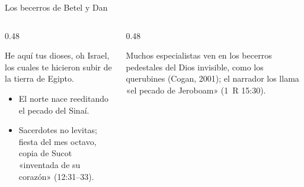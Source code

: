 \begin{frame}{Los becerros de Betel y Dan}
\begin{columns}[T,onlytextwidth]
\begin{column}{0.48\textwidth}
\par\smallskip
\begin{cita}He aquí tus dioses, oh Israel, los cuales te hicieron subir de la tierra de Egipto.\end{cita}
\footnotesize
\begin{itemize}
\item El norte nace reeditando el pecado del Sinaí.
\item Sacerdotes no levitas; fiesta del mes octavo, copia de Sucot «inventada de su corazón» (12:31--33).
\end{itemize}
\end{column}
\begin{column}{0.48\textwidth}\centering
{}
\begin{notalam}
Muchos especialistas ven en los becerros pedestales del Dios invisible, como los querubines (Cogan, 2001); el narrador los llama «el pecado de Jeroboam» (1~R 15:30).
\end{notalam}
\end{column}
\end{columns}
\end{frame}

